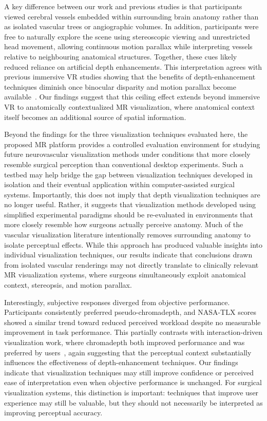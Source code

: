 \documentclass[runningheads]{llncs}
\begin{document}
A key difference between our work and previous studies is that participants viewed cerebral vessels embedded within surrounding brain anatomy rather than as isolated vascular trees or angiographic volumes. In addition, participants were free to naturally explore the scene using stereoscopic viewing and unrestricted head movement, allowing continuous motion parallax while interpreting vessels relative to neighbouring anatomical structures. Together, these cues likely reduced reliance on artificial depth enhancements. This interpretation agrees with previous immersive VR studies showing that the benefits of depth-enhancement techniques diminish once binocular disparity and motion parallax become available~\cite{heinrich_estimating_2021,titov_effect_2021,lesar_evaluation_2024}. Our findings suggest that this ceiling effect extends beyond immersive VR to anatomically contextualized MR visualization, where anatomical context itself becomes an additional source of spatial information.

Beyond the findings for the three visualization techniques evaluated here, the proposed MR platform provides a controlled evaluation environment for studying future neurovascular visualization methods under conditions that more closely resemble surgical perception than conventional desktop experiments. Such a testbed may help bridge the gap between visualization techniques developed in isolation and their eventual application within computer-assisted surgical systems. Importantly, this does not imply that depth visualization techniques are no longer useful. Rather, it suggests that visualization methods developed using simplified experimental paradigms should be re-evaluated in environments that more closely resemble how surgeons actually perceive anatomy. Much of the vascular visualization literature intentionally removes surrounding anatomy to isolate perceptual effects. While this approach has produced valuable insights into individual visualization techniques, our results indicate that conclusions drawn from isolated vascular renderings may not directly translate to clinically relevant MR visualization systems, where surgeons simultaneously exploit anatomical context, stereopsis, and motion parallax.

Interestingly, subjective responses diverged from objective performance. Participants consistently preferred pseudo-chromadepth, and NASA-TLX scores showed a similar trend toward reduced perceived workload despite no measurable improvement in task performance. This partially contrasts with interaction-driven visualization work, where chromadepth both improved performance and was preferred by users~\cite{drouin_interaction_2018}, again suggesting that the perceptual context substantially influences the effectiveness of depth-enhancement techniques. Our findings indicate that visualization techniques may still improve confidence or perceived ease of interpretation even when objective performance is unchanged. For surgical visualization systems, this distinction is important: techniques that improve user experience may still be valuable, but they should not necessarily be interpreted as improving perceptual accuracy.
\end{document}
